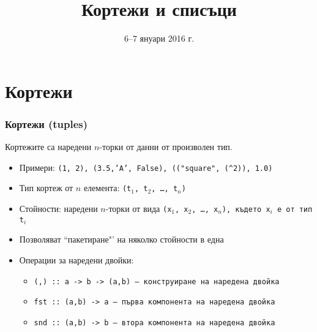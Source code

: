 \documentclass{beamer}
\title{Кортежи и списъци}
\date{6--7 януари 2016 г.}
\begin{document}
\begin{frame}
  \titlepage
\end{frame}

\section{Кортежи}

\begin{frame}
  \frametitle{Кортежи (tuples)}
  Кортежите са наредени $n$-торки от данни от произволен тип.
  \begin{itemize}[<+->]
  \item Примери: \tt{(1, 2)}, \tt{(3.5,'A', False)}, \tt{(("square"{}, (\^{}2)), 1.0)}
  \item Тип кортеж от $n$ елемента: \tt{(t$_1$, t$_2$, \ldots, t$_n$)}
  \item Стойности: наредени $n$-торки от вида \tt{(x$_1$, x$_2$, \ldots, x$_n$)}, където \tt{x$_i$} е от тип \tt{t$_i$}
  \item Позволяват ``пакетиране"' на няколко стойности в една
  \item Операции за наредени двойки:
    \begin{itemize}
    \item \tt{(,) :: a -> b -> (a,b)} --- конструиране на наредена двойка
    \item \tt{fst :: (a,b) -> a} --- първа компонента на наредена двойка
    \item \tt{snd :: (a,b) -> b} --- втора компонента на наредена двойка
    \end{itemize}
  \end{itemize}
\end{frame}
\end{document}
